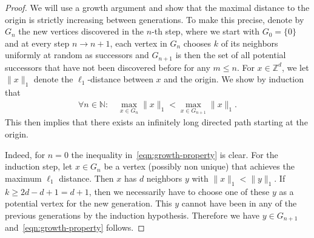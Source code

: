 \documentclass[oneside]{amsart}
\newcommand{\N}{\mathbb{N}}
\theoremstyle{definition}
\newcommand{\1}{\mathbbm{1}}
\newcommand{\0}{\mathbf{o}}
\newcommand{\Z}{\mathbb{Z}}
\numberwithin{equation}{section}
\begin{document}
\begin{proof}
    We will use a growth argument and show that the maximal distance to the origin is strictly increasing between generations. To make this precise, denote by $G_n$ the new vertices discovered in the $n$-th step, where we start with $G_0 = \{0\}$ and at every step $n \to n+1$, each vertex in $G_n$ chooses $k$ of its neighbors uniformly at random as successors and $G_{n+1}$ is then the set of all potential successors that have not been discovered before for any $m  \leq n$. For $x\in\Z^d$, we let $\|x\|_1$ denote the $\ell_1$-distance between $x$ and the origin. We show by induction that 
    \begin{align}\label{eqn:growth-property}
         \forall n  \in \N:   \quad \max_{x \in G_n}\|x\|_1 < \max_{x \in G_{n+1}}\|x\|_1.  
    \end{align}
    This then implies that there exists an infinitely long directed path starting at the origin. 
    
    Indeed, for $n=0$ the inequality in~\eqref{eqn:growth-property} is clear. For the induction step, let $x \in G_n$ be a vertex (possibly non unique) that achieves the maximum $\ell_1$ distance. Then $x$ has $d$ neighbors $y$ with $\|x\|_1 < \|y\|_1$. If $k  \geq 2d-d+1=d+1$, then we necessarily have to choose one of these $y$ as a potential vertex for the new generation. This $y$ cannot have been in any of the previous generations by the induction hypothesis. Therefore we have $y \in G_{n+1}$ and~\eqref{eqn:growth-property} follows. 
\end{proof}
\end{document}
